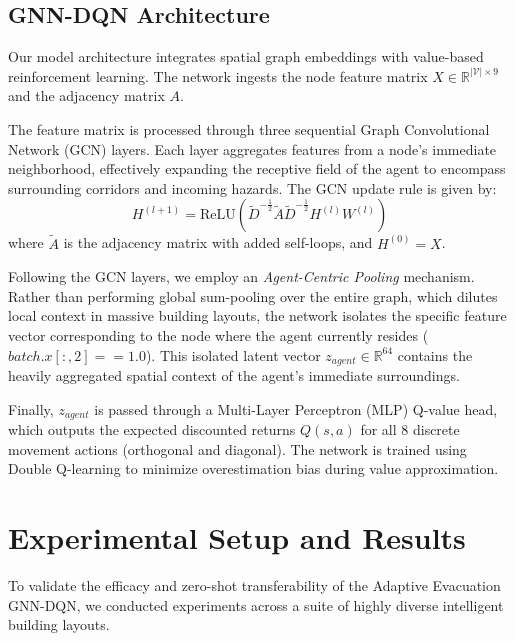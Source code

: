\documentclass[conference]{IEEEtran}
\begin{document}
\subsection{GNN-DQN Architecture}
Our model architecture integrates spatial graph embeddings with value-based reinforcement learning. The network ingests the node feature matrix $X \in \mathbb{R}^{|\mathcal{V}| \times 9}$ and the adjacency matrix $A$.

The feature matrix is processed through three sequential Graph Convolutional Network (GCN) layers. Each layer aggregates features from a node's immediate neighborhood, effectively expanding the receptive field of the agent to encompass surrounding corridors and incoming hazards. The GCN update rule is given by:
\begin{equation}
    H^{(l+1)} = \text{ReLU}\left( \tilde{D}^{-\frac{1}{2}} \tilde{A} \tilde{D}^{-\frac{1}{2}} H^{(l)} W^{(l)} \right)
\end{equation}
where $\tilde{A}$ is the adjacency matrix with added self-loops, and $H^{(0)} = X$.

Following the GCN layers, we employ an \textit{Agent-Centric Pooling} mechanism. Rather than performing global sum-pooling over the entire graph, which dilutes local context in massive building layouts, the network isolates the specific feature vector corresponding to the node where the agent currently resides ($batch.x[:, 2] == 1.0$). This isolated latent vector $z_{agent} \in \mathbb{R}^{64}$ contains the heavily aggregated spatial context of the agent's immediate surroundings.

Finally, $z_{agent}$ is passed through a Multi-Layer Perceptron (MLP) Q-value head, which outputs the expected discounted returns $Q(s, a)$ for all 8 discrete movement actions (orthogonal and diagonal). The network is trained using Double Q-learning to minimize overestimation bias during value approximation.

\section{Experimental Setup and Results}
\label{sec:experiments}
To validate the efficacy and zero-shot transferability of the Adaptive Evacuation GNN-DQN, we conducted experiments across a suite of highly diverse intelligent building layouts.
\end{document}
